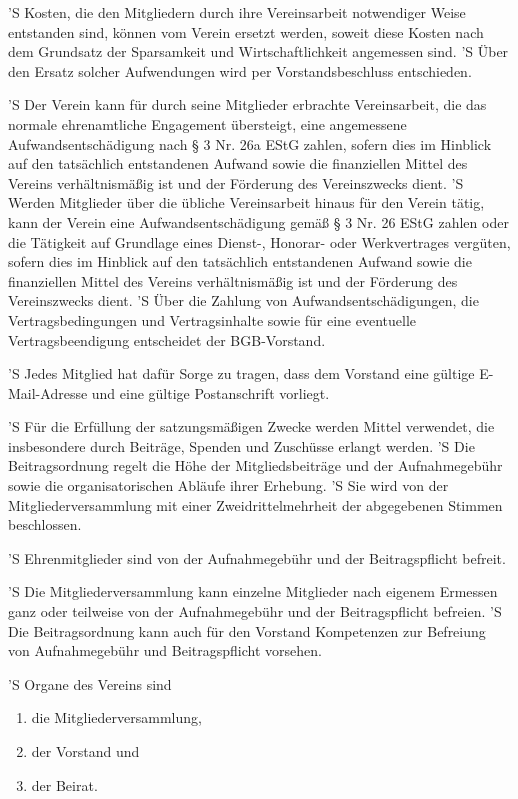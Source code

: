 \documentclass[a4paper,10pt]{scrreprt}
\begin{document}
\begin{contract}
'S Kosten, die den Mitgliedern durch ihre Vereinsarbeit notwendiger Weise
entstanden sind, können vom Verein ersetzt werden, soweit diese Kosten nach dem
Grundsatz der Sparsamkeit und Wirtschaftlichkeit angemessen sind.
'S Über den Ersatz solcher Aufwendungen wird per Vorstandsbeschluss entschieden.

'S Der Verein kann für durch seine Mitglieder erbrachte Vereinsarbeit, die das
normale ehrenamtliche Engagement übersteigt, eine angemessene
Aufwandsentschädigung nach § 3 Nr. 26a EStG zahlen, sofern dies im Hinblick auf
den tatsächlich entstandenen Aufwand sowie die finanziellen Mittel des Vereins
verhältnismäßig ist und der Förderung des Vereinszwecks dient.
'S Werden Mitglieder über die übliche Vereinsarbeit hinaus für den Verein
tätig, kann der Verein eine Aufwandsentschädigung gemäß § 3 Nr. 26 EStG zahlen
oder die Tätigkeit auf Grundlage eines Dienst-, Honorar- oder Werkvertrages
vergüten, sofern dies im Hinblick auf den tatsächlich entstandenen Aufwand
sowie die finanziellen Mittel des Vereins verhältnismäßig ist und der Förderung
des Vereinszwecks dient.
'S Über die Zahlung von Aufwandsentschädigungen, die Vertragsbedingungen und
Vertragsinhalte sowie für eine eventuelle Vertragsbeendigung entscheidet der
BGB-Vorstand.

'S Jedes Mitglied hat dafür Sorge zu tragen, dass dem Vorstand eine gültige
E-Mail-Adresse und eine gültige Postanschrift vorliegt.


'S Für die Erfüllung der satzungsmäßigen Zwecke werden Mittel verwendet, die
insbesondere durch Beiträge, Spenden und Zuschüsse erlangt werden.
'S Die Beitragsordnung regelt die Höhe der Mitgliedsbeiträge und der
Aufnahmegebühr sowie die organisatorischen Abläufe ihrer Erhebung.
'S Sie wird von der Mitgliederversammlung mit einer Zweidrittelmehrheit der
abgegebenen Stimmen beschlossen.

'S Ehrenmitglieder sind von der Aufnahmegebühr und der Beitragspflicht befreit.

'S Die Mitgliederversammlung kann einzelne Mitglieder nach eigenem Ermessen
ganz oder teilweise von der Aufnahmegebühr und der Beitragspflicht befreien.
'S Die Beitragsordnung kann auch für den Vorstand Kompetenzen zur Befreiung von
Aufnahmegebühr und Beitragspflicht vorsehen.


'S Organe des Vereins sind
\begin{enumerate}
	\item die Mitgliederversammlung,
	\item der Vorstand und
	\item der Beirat.
\end{enumerate}


\end{contract}
\end{document}
